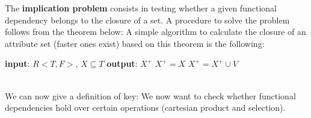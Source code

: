 The \textbf{implication problem} consists in testing whether a given functional dependency belongs to the closure of a set. A procedure to solve the problem follows from the theorem below:
A simple algorithm to calculate the closure of an attribute set (faster ones exist) based on this theorem is the following:
\begin{algorithm}[h]
\caption{SlowClosure.}
\begin{algorithmic}
    \State \textbf{input}: $R<T,F>$, $X \subseteq T$
    \State \textbf{output}: $X^+$
    \State $X^+ = X$
            \State $X^+ = X^+ \cup V$
        \EndFor
    \EndWhile
\end{algorithmic}
\end{algorithm}\\
We can now give a definition of key:
We now want to check whether functional dependencies hold over certain operations (cartesian product and selection).
